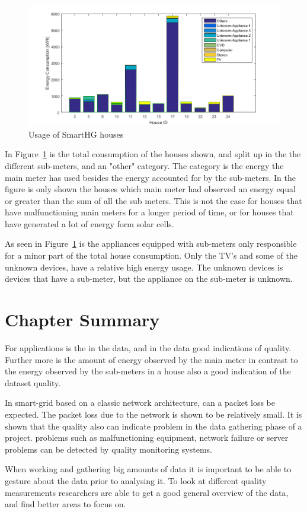 \begin{figure}[H]
\centering
\includegraphics[width=1\textwidth]{billeder/SHGHouseUsagesV2.png}
\caption{Usage of SmartHG houses}
\label{fig:USAGEofSHG}
\end{figure}

In Figure~\ref{fig:USAGEofSHG} is the total consumption of the houses shown, and split up in the the different sub-meters, and an "other" category. The  category is the energy the main meter has used besides the energy accounted for by the sub-meters. In the figure is only shown the houses which main meter had observed an energy equal or greater than the sum of all the sub meters. This is not the case for houses that have malfunctioning main meters for a longer period of time, or for houses that have generated a lot of energy form solar cells. 

As seen in Figure~\ref{fig:USAGEofSHG} is the appliances equipped with sub-meters only responsible for a minor part of the total house consumption. Only the TV's and some of the unknown devices, have a relative high energy usage. The unknown devices is devices that have a sub-meter, but the appliance on the sub-meter is unknown.  

\section{Chapter Summary}
For  applications is the  in the data, and  in the data good indications of quality. Further more is the amount of energy observed by the main meter in contrast to the energy observed by the sub-meters in a house also a good indication of the dataset quality. 

In smart-grid based on a classic  network architecture, can a packet loss be expected. The packet loss due to the network is shown to be relatively small. It is shown that the quality also can indicate problem in the data gathering phase of a project. problems such as malfunctioning equipment, network failure or server problems can be detected by quality monitoring systems.  

When working and gathering big amounts of data it is important to be able to gesture about the data prior to analysing it. To look at different quality measurements researchers are able to get a good general overview of the data, and find better areas to focus on. 

